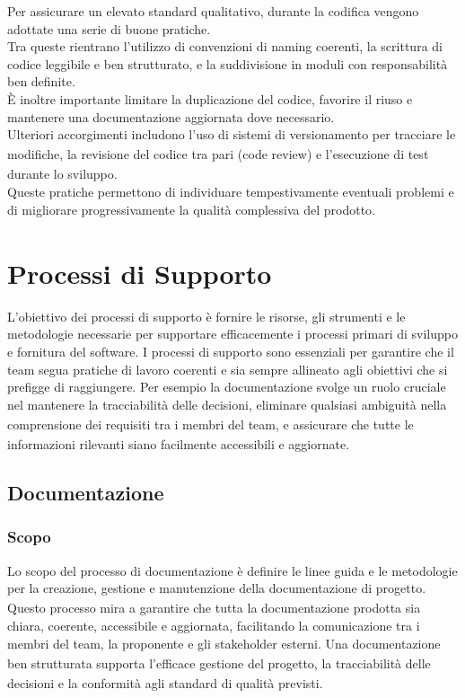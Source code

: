 \documentclass[a4paper,11pt]{article}
\newcommand{\G}{\textsubscript{\scalebox{0.6}{\textbf{G}}}}
\begin{document}
Per assicurare un elevato standard qualitativo, durante la codifica vengono adottate una serie di 
buone pratiche. \\
Tra queste rientrano l'utilizzo di convenzioni di naming coerenti, la scrittura di codice leggibile 
e ben strutturato, e la suddivisione in moduli con responsabilità ben definite. \\
È inoltre importante 
limitare la duplicazione del codice, favorire il riuso e mantenere una documentazione aggiornata dove 
necessario.\\ 
Ulteriori accorgimenti includono l'uso di sistemi di versionamento\G{} per tracciare le modifiche, la 
revisione del codice tra pari (code review) e l'esecuzione di test\G{} durante lo sviluppo. \\
Queste pratiche permettono di individuare tempestivamente eventuali problemi e di migliorare 
progressivamente la qualità\G{} complessiva del prodotto\G{}.


\section{Processi di Supporto}
L'obiettivo dei processi di supporto è fornire le risorse, gli strumenti e le metodologie necessarie per supportare efficacemente i processi primari di sviluppo e fornitura del software.
I processi di supporto sono essenziali per garantire che il team segua pratiche di lavoro coerenti e sia sempre allineato agli obiettivi che si prefigge di raggiungere. Per esempio la documentazione svolge un ruolo cruciale nel mantenere la tracciabilità\G{} delle decisioni, eliminare qualsiasi ambiguità nella comprensione dei requisiti\G{} tra i membri del team, e assicurare che tutte le informazioni rilevanti siano facilmente accessibili e aggiornate.
\subsection{Documentazione}
\subsubsection{Scopo}
Lo scopo del processo di documentazione è definire le linee guida e le metodologie per la creazione, gestione e manutenzione 
della documentazione di progetto\G{}. 
Questo processo mira a garantire che tutta la documentazione prodotta sia chiara, coerente, accessibile e aggiornata, 
facilitando la comunicazione tra i membri del team, la proponente\G{} e gli stakeholder\G{} esterni. Una documentazione ben strutturata supporta
l'efficace gestione del progetto\G{}, la tracciabilità\G{} delle decisioni e la conformità agli standard di qualità\G{} previsti.
\end{document}
